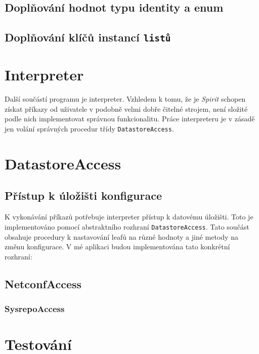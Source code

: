 \documentclass[thesis=B,czech,hidelinks]{FITthesis}[2019/03/06]
\begin{document}
\subsection{Doplňování hodnot typu identity a enum}

\subsection{Doplňování klíčů instancí \texttt{listů}}


\section{Interpreter}
Další součástí programu je interpreter. Vzhledem k tomu, že je \textit{Spirit} schopen získat příkazy od uživatele v podobně velmi dobře čitelné strojem, není složité podle nich implementovat správnou funkcionalitu. Práce interpreteru je v zásadě jen volání správných procedur třídy \texttt{DatastoreAccess}.

\section{DatastoreAccess}
\subsection{Přístup k úložišti konfigurace}
K vykonávání příkazů potřebuje interpreter přístup k datovému úložišti. Toto je implementováno pomocí abstraktního rozhraní \texttt{DatastoreAccess}. Tato součást obsahuje procedury k nastavování leafů na různé hodnoty a jiné metody na změnu konfigurace. V mé aplikaci budou implementována tato konkrétní rozhraní:

\subsection{NetconfAccess}

\subsubsection{SysrepoAccess}

\section{Testování}
\end{document}

